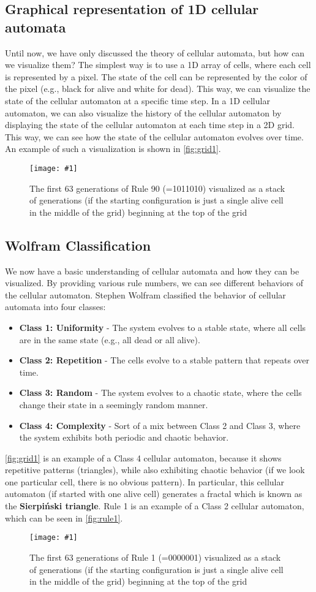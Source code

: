 \documentclass[a4paper,12pt]{llncs}
\numberwithin{equation}{section}
\newcommand{\imagewithwidth}[5]{
  \begin{figure}[htbp]%
    \begin{center}%
      \texttt{[image: \#1]}%
      \caption[#5]{#4}%
      \label{#3}%
    \end{center}%
  \end{figure}
}
\begin{document}
\subsection{Graphical representation of 1D cellular automata}
Until now, we have only discussed the theory of cellular automata, but how can we visualize them?
The simplest way is to use a 1D array of cells, where each cell is represented by a pixel.
The state of the cell can be represented by the color of the pixel (e.g., black for alive and white for dead).
This way, we can visualize the state of the cellular automaton at a specific time step.
In a 1D cellular automaton, we can also visualize the history of the cellular automaton by displaying the state of the cellular automaton at each time step in a 2D grid.
This way, we can see how the state of the cellular automaton evolves over time.
An example of such a visualization is shown in \autoref{fig:grid1}.
\imagewithwidth{figures/rule90}{0.5\textwidth}{fig:grid1}{The first 63 generations of Rule 90 (=1011010) visualized as a stack of generations (if the starting configuration is just a single alive cell in the middle of the grid) beginning at the top of the grid}{}
\subsection{Wolfram Classification}
We now have a basic understanding of cellular automata and how they can be visualized.
By providing various rule numbers, we can see different behaviors of the cellular automaton.
Stephen Wolfram classified the behavior of cellular automata into four classes:
\begin{itemize}
  \item \textbf{Class 1: Uniformity} - The system evolves to a stable state, where all cells are in the same state (e.g., all dead or all alive).
  \item \textbf{Class 2: Repetition} - The cells evolve to a stable pattern that repeats over time.
  \item \textbf{Class 3: Random} - The system evolves to a chaotic state, where the cells change their state in a seemingly random manner.
  \item \textbf{Class 4: Complexity} - Sort of a mix between Class 2 and Class 3, where the system exhibits both periodic and chaotic behavior.
\end{itemize}
\autoref{fig:grid1} is an example of a Class 4 cellular automaton, because it shows repetitive patterns (triangles), while also exhibiting chaotic behavior (if we look one particular cell, there is no obvious pattern). In particular, this cellular automaton (if started with one alive cell) generates a fractal which is known as the \textbf{Sierpiński triangle}.
Rule 1 is an example of a Class 2 cellular automaton, which can be seen in \autoref{fig:rule1}.
\imagewithwidth{figures/rule1}{0.7\textwidth}{fig:rule1}{The first 63 generations of Rule 1 (=0000001) visualized as a stack of generations (if the starting configuration is just a single alive cell in the middle of the grid) beginning at the top of the grid}{}
\end{document}
